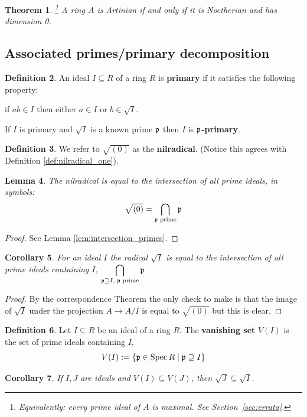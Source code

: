 \documentclass[12pt]{article}
\theoremstyle{plain}
\newtheorem{thm}{Theorem}[subsection] %
\newtheorem{lemma}[thm]{Lemma}
\newtheorem{cor}[thm]{Corollary}
\theoremstyle{definition}
\newtheorem{defn}[thm]{Definition} %
\newcommand{\lto}{\longrightarrow}
\begin{document}
\begin{thm}
\label{prop:artinian_Noeth_dimzero}\footnote{Equivalently: every prime ideal of $A$ is maximal. See Section~\ref{sec:errata}.} A ring $A$ is Artinian if and only if it is Noetherian and has dimension 0.
\end{thm}

\subsection{Associated primes/primary decomposition}
\begin{defn}
\label{def:p-primary}
An ideal $I \subseteq R$ of a ring $R$ is \textbf{primary} if it satisfies the following property:

if $ab \in I$ then either $a \in I$ or $b \in \sqrt{I}$.

If $I$ is primary and $\sqrt{I}$ is a known prime $\frak{p}$ then $I$ is \textbf{$\frak{p}$-primary}.
\end{defn}
\begin{defn}
We refer to $\sqrt{(0)}$ as the \textbf{nilradical}. (Notice this agrees with Definition \ref{def:nilradical_one}).
\end{defn}
\begin{lemma}
The nilradical is equal to the intersection of all prime ideals, in symbols:
\[\sqrt{(0)} = \bigcap_{\frak{p}\text{ prime}}\frak{p}\]
\end{lemma}
\begin{proof}
See Lemma \ref{lem:intersection_primes}.
\end{proof}
\begin{cor}
\label{cor:intersection_primes}
For an ideal $I$ the radical $\sqrt{I}$ is equal to the intersection of all prime ideals containing $I$, $\displaystyle\bigcap_{\frak{p} \supseteq I\text{, }\frak{p}\text{ prime}}\frak{p}$
\end{cor}
\begin{proof}
By the correspondence Theorem the only check to make is that the image of $\sqrt{I}$ under the projection $A \lto A/I$ is equal to $\sqrt{(0)}$ but this is clear.
\end{proof}
\begin{defn}
\label{def:vanishing} Let $I \subseteq R$ be an ideal of a ring $R$. The \textbf{vanishing set} $V(I)$ is the set of prime ideals containing $I$,
\[V(I) := \lbrace \frak{p} \in \operatorname{Spec}R \mid \frak{p} \supseteq I\rbrace\]
\end{defn}
\begin{cor}
\label{cor:vanishing_subset}
If $I,J$ are ideals and $V(I) \subseteq V(J)$, then $\sqrt{J} \subseteq \sqrt{I}$.
\end{cor}
\end{document}

